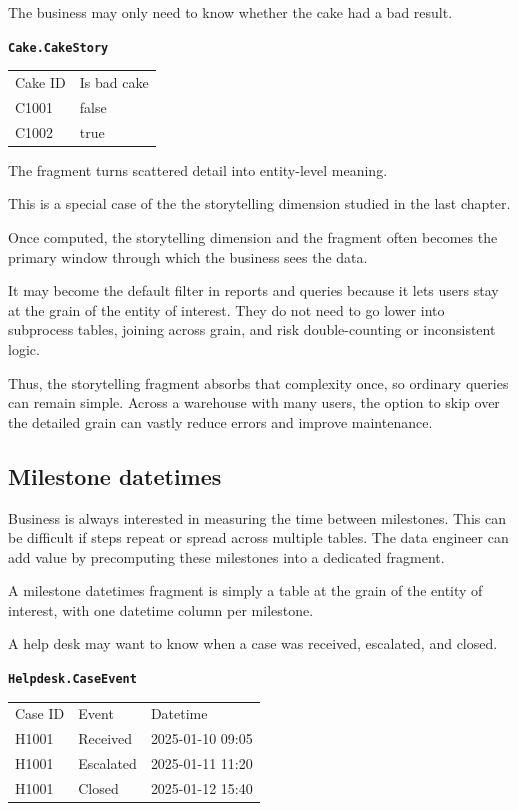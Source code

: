 \documentclass[10pt,openany,10pt]{book}
\newcounter{none}
\let\podeToprule\toprule
\let\podeMidrule\midrule
\let\podeBottomrule\bottomrule
\renewcommand{\toprule}{\arrayrulecolor{pbiGrid}\podeToprule}
\renewcommand{\midrule}{\arrayrulecolor{pbiGrid}\podeMidrule}
\renewcommand{\bottomrule}{\arrayrulecolor{pbiGrid}\podeBottomrule}
\begin{document}
The business may only need to know whether the cake had a bad result.

\textbf{\texttt{Cake.CakeStory}}

{\def\LTcaptype{none} %
\begin{longtable}[]{@{}ll@{}}
\toprule\noalign{}
Cake ID & Is bad cake \\
\midrule\noalign{}
\endhead
\bottomrule\noalign{}
\endlastfoot
C1001 & false \\
C1002 & true \\
\end{longtable}
}

The fragment turns scattered detail into entity-level meaning.

This is a special case of the the storytelling dimension studied in the
last chapter.

Once computed, the storytelling dimension and the fragment often becomes
the primary window through which the business sees the data.

It may become the default filter in reports and queries because it lets
users stay at the grain of the entity of interest. They do not need to
go lower into subprocess tables, joining across grain, and risk
double-counting or inconsistent logic.

Thus, the storytelling fragment absorbs that complexity once, so
ordinary queries can remain simple. Across a warehouse with many users,
the option to skip over the detailed grain can vastly reduce errors and
improve maintenance.

\subsection{Milestone datetimes}\label{milestone-datetimes}

Business is always interested in measuring the time between milestones.
This can be difficult if steps repeat or spread across multiple tables.
The data engineer can add value by precomputing these milestones into a
dedicated fragment.

A milestone datetimes fragment is simply a table at the grain of the
entity of interest, with one datetime column per milestone.

A help desk may want to know when a case was received, escalated, and
closed.

\textbf{\texttt{Helpdesk.CaseEvent}}

{\def\LTcaptype{none} %
\begin{longtable}[]{@{}lll@{}}
\toprule\noalign{}
Case ID & Event & Datetime \\
\midrule\noalign{}
\endhead
\bottomrule\noalign{}
\endlastfoot
H1001 & Received & 2025-01-10 09:05 \\
H1001 & Escalated & 2025-01-11 11:20 \\
H1001 & Closed & 2025-01-12 15:40 \\
\end{longtable}
}
\end{document}
